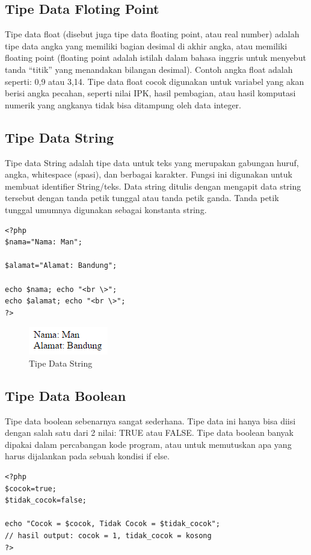 \subsection{Tipe Data Floting Point}
Tipe data float (disebut juga tipe data floating point, atau real number) adalah tipe data angka yang memiliki bagian desimal di akhir angka, atau memiliki floating point (floating point adalah istilah dalam bahasa inggris untuk menyebut tanda “titik” yang menandakan bilangan desimal). Contoh angka float adalah seperti: 0,9 atau 3,14. Tipe data float cocok digunakan untuk variabel yang akan berisi angka pecahan, seperti nilai IPK, hasil pembagian, atau hasil komputasi numerik yang angkanya tidak bisa ditampung oleh data integer.
\subsection{Tipe Data String}
Tipe data String adalah tipe data untuk teks yang merupakan gabungan huruf, angka, whitespace (spasi), dan berbagai karakter. Fungsi ini digunakan untuk membuat identifier String/teks. Data string ditulis dengan mengapit data string tersebut dengan tanda petik tunggal atau tanda petik ganda. Tanda petik tunggal umumnya digunakan sebagai konstanta string.
\begin{lstlisting}
<?php
$nama="Nama: Man";
 
$alamat="Alamat: Bandung";
 
echo $nama; echo "<br \>";
echo $alamat; echo "<br \>";
?>
\end{lstlisting}
\begin{figure}[h]
\centering
\includegraphics[scale=1]{figures/string}
\caption{Tipe Data String}
\label{string}
\end{figure}
\subsection{Tipe Data Boolean}
Tipe data boolean sebenarnya sangat sederhana. Tipe data ini hanya bisa diisi dengan salah satu dari 2 nilai: TRUE atau FALSE. Tipe data boolean banyak dipakai dalam percabangan kode program, atau untuk memutuskan apa yang harus dijalankan pada sebuah kondisi if else.
\begin{lstlisting}
<?php
$cocok=true;
$tidak_cocok=false;
 
echo "Cocok = $cocok, Tidak Cocok = $tidak_cocok";
// hasil output: cocok = 1, tidak_cocok = kosong
?>
\end{lstlisting}


